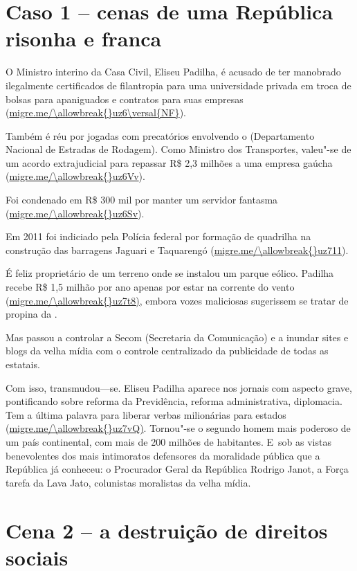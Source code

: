  

\section{Caso 1 -- cenas de uma República risonha e franca}

O Ministro interino da Casa Civil, Eliseu Padilha, é acusado de ter
manobrado ilegalmente certificados de filantropia para uma universidade
privada em troca de bolsas para apaniguados e contratos para suas
empresas (\url{migre.me/\allowbreak{}uz6\versal{NF}}).

Também é réu por jogadas com precatórios envolvendo o  (Departamento
Nacional de Estradas de Rodagem). Como Ministro dos Transportes,
valeu"-se de um acordo extrajudicial para repassar R\$ 2,3 milhões a uma
empresa gaúcha (\url{migre.me/\allowbreak{}uz6Vv}).

Foi condenado em R\$ 300 mil por manter um servidor fantasma
(\url{migre.me/\allowbreak{}uz6Sv}).

Em 2011 foi indiciado pela Polícia federal por formação de quadrilha na
construção das barragens Jaguari e Taquarengó
(\url{migre.me/\allowbreak{}uz711}).

É feliz proprietário de um terreno onde se instalou um parque eólico.
Padilha recebe R\$ 1,5 milhão por ano apenas por estar na corrente do
vento (\url{migre.me/\allowbreak{}uz7t8)}, embora vozes maliciosas sugerissem
se tratar de propina da .

Mas passou a controlar a Secom (Secretaria da Comunicação) e a inundar
sites e blogs da velha mídia com o controle centralizado da publicidade
de todas as estatais.

Com isso, transmudou---se. Eliseu Padilha aparece nos jornais com
aspecto grave, pontificando sobre reforma da Previdência, reforma
administrativa, diplomacia. Tem a última palavra para liberar verbas
milionárias para estados (\url{migre.me/\allowbreak{}uz7vQ)}. Tornou"-se o
segundo homem mais poderoso de um país continental, com mais de 200
milhões de habitantes. E~sob as vistas benevolentes dos mais intimoratos
defensores da moralidade pública que a República já conheceu: o
Procurador Geral da República Rodrigo Janot, a Força tarefa da Lava
Jato, colunistas moralistas da velha mídia.

\section{Cena 2 -- a destruição de direitos sociais}

